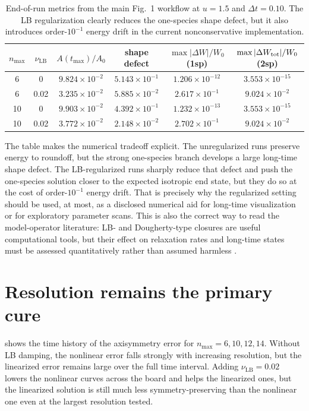 \documentclass[11pt]{article}
\begin{document}
\begin{table}[H]
    \centering
    \caption{End-of-run metrics from the main Fig.~1 workflow at $u=1.5$ and $\Delta t=0.10$.
    The LB regularization clearly reduces the one-species shape defect, but it also introduces order-\(10^{-1}\) energy drift in the current nonconservative implementation.}
    \label{tab:fig1_u15}
    \begin{tabular}{@{}cccccc@{}}
    \toprule
    $n_{\max}$ & $\nu_{\mathrm{LB}}$ & $A(t_{\max})/A_0$ & shape defect & $\max |\Delta W|/W_0$ (1sp) & $\max |\Delta W_{\rm tot}|/W_0$ (2sp) \\
    \midrule
    6  & 0     & $9.824\times10^{-2}$ & $5.143\times10^{-1}$ & $1.206\times10^{-12}$ & $3.553\times10^{-15}$ \\
    6  & 0.02  & $3.235\times10^{-2}$ & $5.885\times10^{-2}$ & $2.617\times10^{-1}$ & $9.024\times10^{-2}$ \\
    10 & 0     & $9.903\times10^{-2}$ & $4.392\times10^{-1}$ & $1.232\times10^{-13}$ & $3.553\times10^{-15}$ \\
    10 & 0.02  & $3.772\times10^{-2}$ & $2.148\times10^{-2}$ & $2.702\times10^{-1}$ & $9.024\times10^{-2}$ \\
    \bottomrule
    \end{tabular}
\end{table}

The table makes the numerical tradeoff explicit.
The unregularized runs preserve energy to roundoff, but the strong one-species branch develops a large long-time shape defect.
The LB-regularized runs sharply reduce that defect and push the one-species solution closer to the expected isotropic end state, but they do so at the cost of order-$10^{-1}$ energy drift.
That is precisely why the regularized setting should be used, at most, as a disclosed numerical aid for long-time visualization or for exploratory parameter scans.
This is also the correct way to read the model-operator literature:
LB- and Dougherty-type closures are useful computational tools, but their effect on relaxation rates and long-time states must be assessed quantitatively rather than assumed harmless \cite{belli2017advanced,jorge2019collisionality}.

\section{Resolution remains the primary cure}
 shows the time history of the axisymmetry error for $n_{\max}=6,10,12,14$.
Without LB damping, the nonlinear error falls strongly with increasing resolution, but the linearized error remains large over the full time interval.
Adding $\nu_{\mathrm{LB}}=0.02$ lowers the nonlinear curves across the board and helps the linearized ones, but the linearized solution is still much less symmetry-preserving than the nonlinear one even at the largest resolution tested.
\end{document}

